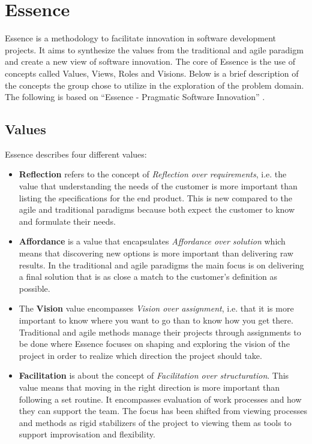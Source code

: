\section{Essence}
Essence is a methodology to facilitate innovation in software development projects. It aims to synthesize the values from the traditional and agile paradigm and create a new view of software innovation. The core of Essence is the use of concepts called Values, Views, Roles and Visions. Below is a brief description of the concepts the group chose to utilize in the exploration of the problem domain. The following is based on ``Essence - Pragmatic Software Innovation'' \cite{essence}.

\subsection{Values} 
Essence describes four different values: 
\begin{itemize}
\item \textbf{Reflection} refers to the concept of \textit{Reflection over requirements}, i.e. the value that understanding the needs of the customer is more important than listing the specifications for the end product. This is new compared to the agile and traditional paradigms because both expect the customer to know and formulate their needs.  
\item \textbf{Affordance} is a value that encapsulates \textit{Affordance over solution} which means that discovering new options is more important than delivering raw results. In the traditional and agile paradigms the main focus is on delivering a final solution that is as close a match to the customer's definition as possible. 
\item The \textbf{Vision} value encompasses \textit{Vision over assignment}, i.e. that it is more important to know where you want to go than to know how you get there. Traditional and agile methods manage their projects through assignments to be done where Essence focuses on shaping and exploring the vision of the project in order to realize which direction the project should take.
\item \textbf{Facilitation} is about the concept of \textit{Facilitation over structuration}. This value means that moving in the right direction is more important than following a set routine. It encompasses evaluation of work processes and how they can support the team. The focus has been shifted from viewing processes and methods as rigid stabilizers of the project to viewing them as tools to support improvisation and flexibility.
\end{itemize}

